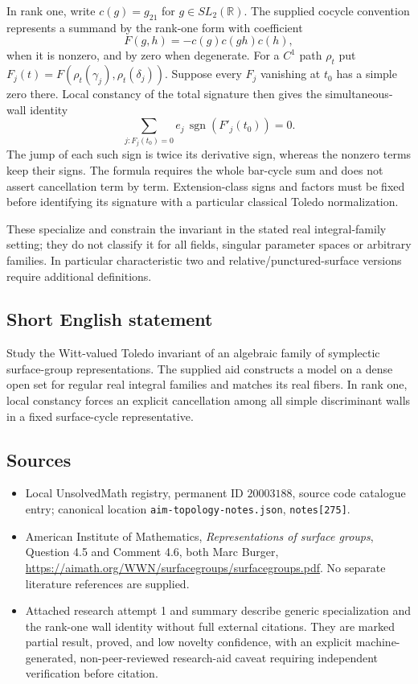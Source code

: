 \documentclass[11pt]{article}
\newcommand{\R}{\mathbb{R}}
\begin{document}
In rank one, write $c(g)=g_{21}$ for $g\in SL_2(\R)$. The supplied cocycle convention represents a summand by the rank-one form with coefficient
\[
 F(g,h)=-c(g)c(gh)c(h),
\]
when it is nonzero, and by zero when degenerate. For a $C^1$ path $\rho_t$ put $F_j(t)=F(\rho_t(\gamma_j),\rho_t(\delta_j))$. Suppose every $F_j$ vanishing at $t_0$ has a simple zero there. Local constancy of the total signature then gives the simultaneous-wall identity
\[
 \sum_{j:F_j(t_0)=0}e_j\,\operatorname{sgn}(F'_j(t_0))=0.
\]
The jump of each such sign is twice its derivative sign, whereas the nonzero terms keep their signs. The formula requires the whole bar-cycle sum and does not assert cancellation term by term. Extension-class signs and factors must be fixed before identifying its signature with a particular classical Toledo normalization.

These specialize and constrain the invariant in the stated real integral-family setting; they do not classify it for all fields, singular parameter spaces or arbitrary families. In particular characteristic two and relative/punctured-surface versions require additional definitions.
\subsection{Short English statement}
Study the Witt-valued Toledo invariant of an algebraic family of symplectic surface-group representations. The supplied aid constructs a model on a dense open set for regular real integral families and matches its real fibers. In rank one, local constancy forces an explicit cancellation among all simple discriminant walls in a fixed surface-cycle representative.
\subsection{Sources}
\begin{itemize}
\item Local UnsolvedMath registry, permanent ID $20003188$, source code catalogue entry; canonical location \texttt{aim-topology-notes.json}, \texttt{notes[275]}.
\item American Institute of Mathematics, \emph{Representations of surface groups}, Question 4.5 and Comment 4.6, both Marc Burger, \url{https://aimath.org/WWN/surfacegroups/surfacegroups.pdf}. No separate literature references are supplied.
\item Attached research attempt 1 and summary describe generic specialization and the rank-one wall identity without full external citations. They are marked partial result, proved, and low novelty confidence, with an explicit machine-generated, non-peer-reviewed research-aid caveat requiring independent verification before citation.
\end{itemize}
\end{document}
